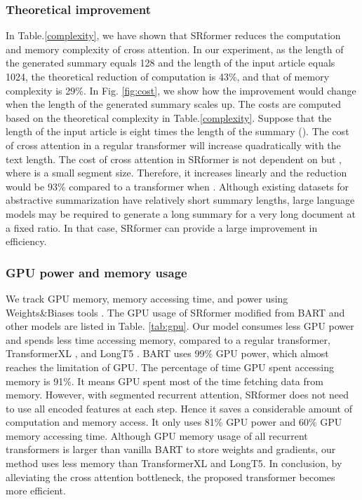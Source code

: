 \documentclass[11pt]{article}
\begin{document}
\subsubsection{Theoretical improvement}
In Table.\ref{complexity}, we have shown that SRformer reduces the computation and memory complexity of cross attention. In our experiment, as the length of the generated summary  equals 128 and the length of the input article  equals 1024, the theoretical reduction of computation is 43\%, and that of memory complexity is 29\%. In Fig. \ref{fig:cost}, we show how the improvement would change when the length of the generated summary scales up. The costs are computed based on the theoretical complexity in Table.\ref{complexity}. Suppose that the length of the input article is eight times the length of the summary (). The cost of cross attention in a regular transformer will increase quadratically with the text length. The cost of cross attention in SRformer is not dependent on  but , where  is a small segment size. Therefore, it increases linearly and the reduction would be 93\% compared to a transformer when . Although existing datasets for abstractive summarization have relatively short summary lengths, large language models may be required to generate a long summary for a very long document at a fixed ratio. In that case, SRformer can provide a large improvement in efficiency.

\subsubsection{GPU power and memory usage}
\label{gpupower}
We track GPU memory, memory accessing time, and power using Weights\&Biases tools \cite{wandb}. The GPU usage of SRformer modified from BART and other models are listed in Table. \ref{tab:gpu}. Our model consumes less GPU power and spends less time accessing memory, compared to a regular transformer, TransformerXL \cite{transformerxl}, and LongT5 \cite{longt5}. BART uses 99\% GPU power, which almost reaches the limitation of GPU. The percentage of time GPU spent accessing memory is 91\%. It means GPU spent most of the time fetching data from memory. However, with segmented recurrent attention, SRformer does not need to use all encoded features at each step. Hence it saves a considerable amount of computation and memory access. It only uses 81\% GPU power and 60\% GPU memory accessing time.  Although GPU memory usage of all recurrent transformers is larger than vanilla BART to store weights and gradients, our method uses less memory than TransformerXL and LongT5. In conclusion, by alleviating the cross attention bottleneck, the proposed transformer becomes more efficient.
\end{document}
